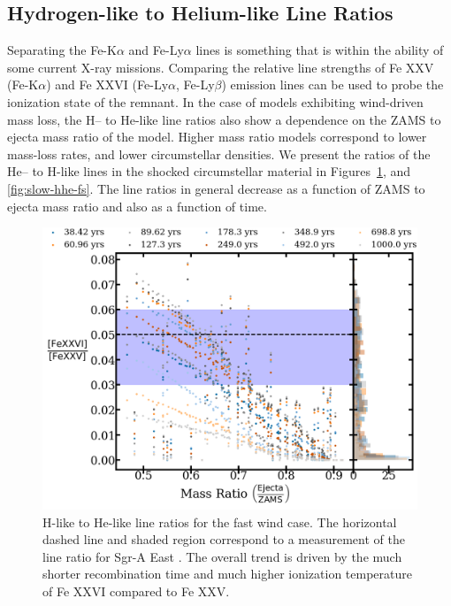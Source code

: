 \documentclass[twocolumn]{aastex631}
\begin{document}
\subsection{Hydrogen-like to Helium-like Line Ratios}
\label{hhefs}
Separating the Fe-K$\alpha$ and Fe-Ly$\alpha$ lines is something that is within the ability of some current X-ray missions. Comparing the relative line strengths of Fe XXV (Fe-K$\alpha$) and Fe XXVI (Fe-Ly$\alpha$, Fe-Ly$\beta$) emission lines can be used to probe the ionization state of the remnant. In the case of models exhibiting wind-driven mass loss, the H-- to He-like line ratios also show a dependence on the ZAMS to ejecta mass ratio of the model. Higher mass ratio models correspond to lower mass-loss rates, and lower circumstellar densities. We present the ratios of the He-- to H-like lines in the shocked circumstellar material in Figures~\ref{fig:fast-hhe-fs}, and \ref{fig:slow-hhe-fs}. The line ratios in general decrease as a function of ZAMS to ejecta mass ratio and also as a function of time. 
\begin{figure}[htb]
    \centering
    \includegraphics[scale=0.17]{fasthherat.png}
    \caption{H-like to He-like line ratios for the fast wind case. The horizontal dashed line and shaded region correspond to a measurement of the line ratio for Sgr-A East \citep{koyama}. The overall trend is driven by the much shorter recombination time and much higher ionization temperature of Fe XXVI compared to Fe XXV.}
    \label{fig:fast-hhe-fs}
\end{figure}
\end{document}
